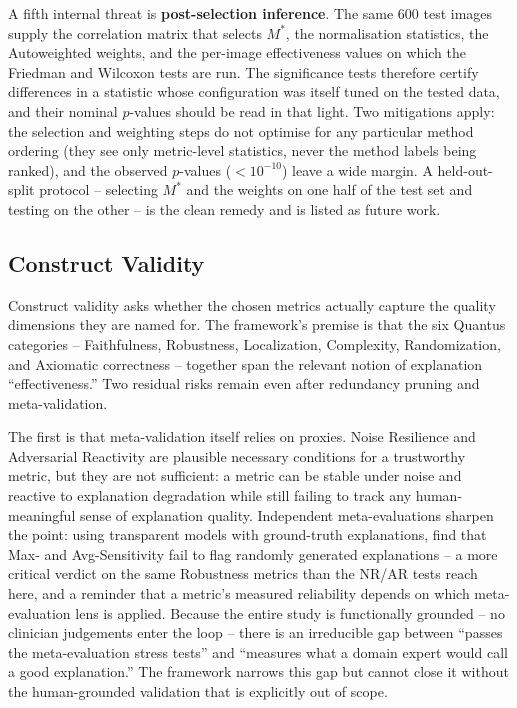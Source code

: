 A fifth internal threat is \textbf{post-selection inference}. The same 600
test images supply the correlation matrix that selects $M^{*}$, the
normalisation statistics, the Autoweighted weights, and the per-image
effectiveness values on which the Friedman and Wilcoxon tests are run. The
significance tests therefore certify differences in a statistic whose
configuration was itself tuned on the tested data, and their nominal
$p$-values should be read in that light. Two mitigations apply: the
selection and weighting steps do not optimise for any particular method
ordering (they see only metric-level statistics, never the method
labels being ranked), and the observed $p$-values ($<10^{-10}$) leave a wide
margin. A held-out-split protocol -- selecting $M^{*}$ and the weights on one
half of the test set and testing on the other -- is the clean remedy and is
listed as future work.

\subsection{Construct Validity}

Construct validity asks whether the chosen metrics actually capture the quality
dimensions they are named for. The framework's premise is that the six Quantus
categories -- Faithfulness, Robustness, Localization, Complexity, Randomization,
and Axiomatic correctness -- together span the relevant notion of explanation
``effectiveness.'' Two residual risks remain even after redundancy pruning and
meta-validation.

The first is that meta-validation itself relies on proxies. Noise Resilience
and Adversarial Reactivity \citep{hedstrom2024metaquantus} are plausible
necessary conditions for a trustworthy metric, but they are not sufficient: a
metric can be stable under noise and reactive to explanation degradation while
still failing to track any human-meaningful sense of explanation quality.
Independent meta-evaluations sharpen the point: using transparent models with
ground-truth explanations, \citet{miro2024stability} find that Max- and
Avg-Sensitivity fail to flag randomly generated explanations -- a more
critical verdict on the same Robustness metrics than the NR/AR tests reach
here, and a reminder that a metric's measured reliability depends on which
meta-evaluation lens is applied.
Because the entire study is functionally grounded -- no clinician judgements
enter the loop -- there is an irreducible gap between ``passes the
meta-evaluation stress tests'' and ``measures what a domain expert would call a
good explanation.'' The framework narrows this gap but cannot close it without
the human-grounded validation that is explicitly out of scope.

